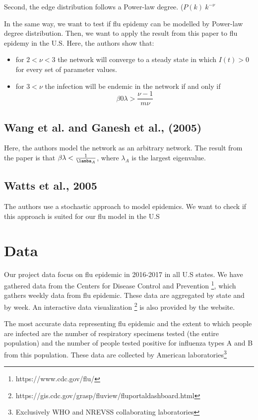 Second, the edge distribution follows a Power-law degree. ($P(k) ~ k^{-\nu}$

In the same way, we want to test if flu epidemy can be modelled by Power-law degree distribution.
Then, we want to apply the result from this paper to flu epidemy in the U.S.
Here, the authors show that:
\begin{itemize}
    \item for $2<\nu<3$ the network will converge to a steady state in which $I(t)>0$ for every set of parameter values.
    \item for $3<\nu$ the infection will be endemic in the network if and only if 
    $$\beta0 \lambda > \frac{\nu-1}{m \nu}$$
\end{itemize}


\subsection{Wang et al. and Ganesh et al., (2005) \cite{wang2003epidemic,ganesh2005effect}}

Here, the authors model the network as an arbitrary network.
The result from the paper is that $\beta \lambda < \frac{1}{\lamba_A}$, where $\lambda_A$ is the largest eigenvalue.


\subsection{Watts et al., 2005 \cite{watts2005multiscale}
}

The authors use a stochastic approach to model epidemics. We want to check if this approach is suited for our flu model in the U.S

\section{Data}

Our project data focus on flu epidemic in 2016-2017 in all U.S states.
 We have gathered data from the Centers for Disease Control and Prevention \footnote{https://www.cdc.gov/flu/}, which gathers weekly data from flu epidemic. These data are aggregated by state and by week.
 An interactive data visualization \footnote{https://gis.cdc.gov/grasp/fluview/fluportaldashboard.html} is also provided by the website.
 
 The most accurate data representing flu epidemic and the extent to which people are infected are the number of respiratory specimens tested (the entire population) and the number of people tested positive for influenza types A and B from this population.
 These data are collected by American laboratories\footnote{Exclusively WHO and NREVSS collaborating laboratories}
 
